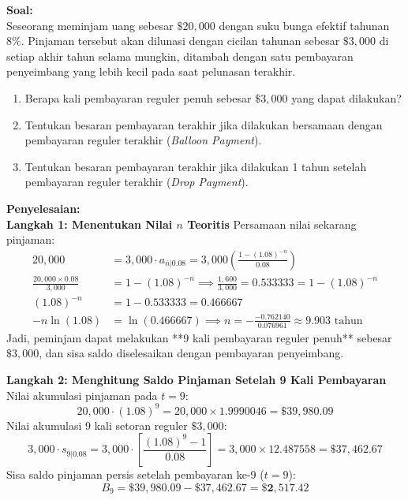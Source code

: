 \documentclass[11pt,a4paper]{article}
\begin{document}
\begin{examplebox}
\textbf{Soal:}\\
Seseorang meminjam uang sebesar $\$20{,}000$ dengan suku bunga efektif tahunan $8\%$. Pinjaman tersebut akan dilunasi dengan cicilan tahunan sebesar $\$3{,}000$ di setiap akhir tahun selama mungkin, ditambah dengan satu pembayaran penyeimbang yang lebih kecil pada saat pelunasan terakhir.
\begin{enumerate}[label=(\alph*)]
    \item Berapa kali pembayaran reguler penuh sebesar $\$3{,}000$ yang dapat dilakukan?
    \item Tentukan besaran pembayaran terakhir jika dilakukan bersamaan dengan pembayaran reguler terakhir (\textit{Balloon Payment}).
    \item Tentukan besaran pembayaran terakhir jika dilakukan 1 tahun setelah pembayaran reguler terakhir (\textit{Drop Payment}).
\end{enumerate}

\vspace{0.5em}
\textbf{Penyelesaian:}\\
\textbf{Langkah 1: Menentukan Nilai $n$ Teoritis}
Persamaan nilai sekarang pinjaman:
\begin{align*}
    20{,}000 &= 3{,}000 \cdot a_{\overline{n}|0.08} = 3{,}000 \left(\frac{1 - (1.08)^{-n}}{0.08}\right) \\[0.4em]
    \frac{20{,}000 \times 0.08}{3{,}000} &= 1 - (1.08)^{-n} \implies \frac{1{,}600}{3{,}000} = 0.533333 = 1 - (1.08)^{-n} \\[0.4em]
    (1.08)^{-n} &= 1 - 0.533333 = 0.466667 \\[0.4em]
    -n \ln(1.08) &= \ln(0.466667) \implies n = -\frac{-0.762140}{0.076961} \approx 9.903 \text{ tahun}
\end{align*}
Jadi, peminjam dapat melakukan **$9$ kali pembayaran reguler penuh** sebesar $\$3{,}000$, dan sisa saldo diselesaikan dengan pembayaran penyeimbang.

\textbf{Langkah 2: Menghitung Saldo Pinjaman Setelah 9 Kali Pembayaran}
Nilai akumulasi pinjaman pada $t = 9$:
\begin{equation*}
    20{,}000 \cdot (1.08)^9 = 20{,}000 \times 1.9990046 = \$39{,}980.09
\end{equation*}
Nilai akumulasi 9 kali setoran reguler $\$3{,}000$:
\begin{equation*}
    3{,}000 \cdot s_{\overline{9}|0.08} = 3{,}000 \cdot \left[\frac{(1.08)^9 - 1}{0.08}\right] = 3{,}000 \times 12.487558 = \$37{,}462.67
\end{equation*}
Sisa saldo pinjaman persis setelah pembayaran ke-9 ($t = 9$):
\begin{equation*}
    B_9 = \$39{,}980.09 - \$37{,}462.67 = \mathbf{\$2{,}517.42}
\end{equation*}


\end{examplebox}
\end{document}
